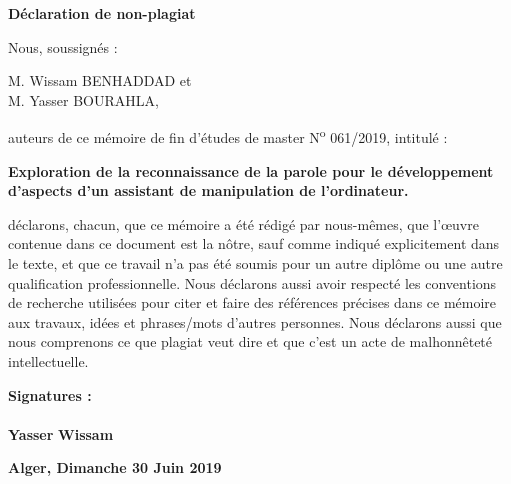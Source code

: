 \newpage
\vspace*{1.2cm}
\begin{center}
    \Large
    \textbf{Déclaration de non-plagiat}
\end{center}
\vspace*{2.5cm}
Nous, soussignés :
\vspace*{0.5cm}

M. Wissam BENHADDAD et\\
M. Yasser BOURAHLA,
\vspace*{1cm}

auteurs de ce mémoire de fin d'études de master N\textsuperscript{o} 061/2019, intitulé :
\begin{center}
\large
\textbf{
Exploration de la reconnaissance de la parole pour le développement d'aspects d'un assistant de manipulation de l'ordinateur.
}
\end{center}
\vspace*{1.2cm}


déclarons, chacun, que ce mémoire a été rédigé par nous-mêmes, que l'\oe{}uvre contenue dans ce document est la nôtre, sauf comme indiqué explicitement dans le texte, et que ce travail n'a pas été soumis pour un autre diplôme ou une autre qualification professionnelle. Nous déclarons aussi avoir respecté les conventions de recherche utilisées pour citer et faire des références précises dans ce mémoire aux travaux, idées et phrases/mots d'autres personnes. Nous déclarons aussi que nous comprenons ce que plagiat veut dire et que c’est un acte de malhonnêteté intellectuelle. 



\vspace*{1cm}
\textbf{Signatures :}\\\\
\hspace*{3cm}
\textbf{Yasser}
\hspace*{6cm}
\textbf{Wissam}


\vspace*{3cm}
\hspace*{9cm}
\textbf{Alger, Dimanche 30 Juin 2019}